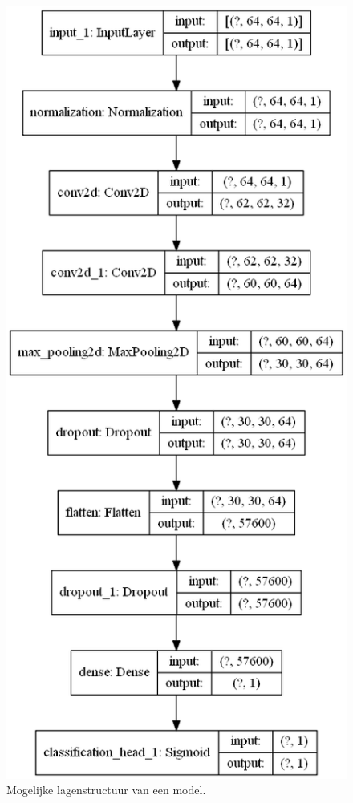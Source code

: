 \begin{figure}
    \centering
    \includegraphics[width=0.7\linewidth]{img/model-samenvatting.png}
    \caption{Mogelijke lagenstructuur van een model.}
    \label{fig:layer-autokeras}
\end{figure}

